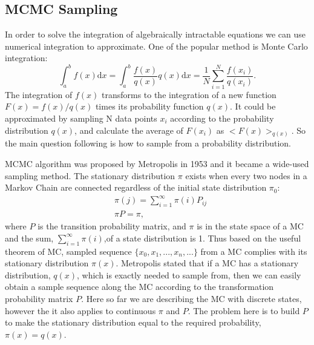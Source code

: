 \documentclass[11pt,twoside,a4paper]{article}
\def\D{\mathrm{d}}
\begin{document}
\subsection{MCMC Sampling}
	\label{sec:mcmc}
	In order to solve the integration of algebraically intractable equations we can use numerical integration to approximate.
	One of the popular method is Monte Carlo integration:
	\begin{equation}
	\int_{a}^{b} f(x) \D x = \int_{a}^{b}\frac{f(x)}{q(x)}q(x)\D x = \dfrac{1}{N}\sum_{i=1}^{N}\frac{f(x_i)}{q(x_i)}.
	\end{equation}
	The integration of $ f(x) $ transforms to the integration of a new function $ F(x) = f(x)/q(x)  $ times its probability function $ q(x) $.
	It could be approximated by sampling N data points $ x_i $ according to the probability distribution $ q(x) $, and calculate the average of $ F(x_i) $ as $ <F(x)>_{q(x)}$.
	So the main question following is how to sample from a probability distribution.
	
	MCMC algorithm was proposed by Metropolis in 1953 and it became a wide-used sampling method.
	The stationary distribution $ \pi $ exists when every two nodes in a Markov Chain are connected regardless of the initial state distribution $ \pi_0 $:
	\begin{equation}
	\begin{aligned}
		&\pi(j) = \sum_{i=1}^{\infty}\pi(i)P_{ij} \\
		&\pi P = \pi,
	\end{aligned}
	\end{equation}
	where $ P $ is the transition probability matrix, and $ \pi $ is in the state space of a MC and the sum, $ \sum_{i=1}^{\infty}\pi(i) $,of a state distribution is 1.
	Thus based on the useful theorem of MC, sampled sequence $ \{x_0, x_1, ..., x_n, ... \}$ from a MC complies with its stationary distribution $ \pi(x) $.
	Metropolis stated that if a MC has a stationary distribution, $ q(x) $, which is exactly needed to sample from, then we can easily obtain a sample sequence along the MC according to the transformation probability matrix $ P $.
	Here so far we are describing the MC with discrete states, however the it also applies to continuous $ \pi $ and $ P $.
	The problem here is to build $ P $ to make the stationary distribution equal to the required probability, $ \pi(x) = q(x) $.
	
\end{document}
